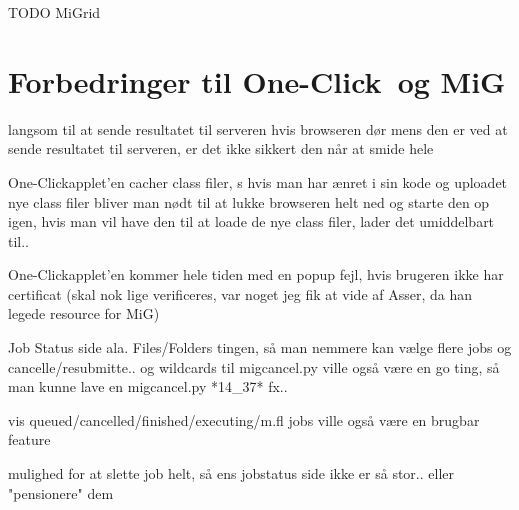 \documentclass[draft,a4paper,10pt]{article}
\newcommand{\mig}{MiG}
\newcommand{\oc}{One-Click}
\begin{document}


TODO MiGrid
\section{Forbedringer til \oc\ og \mig}
%
langsom til at sende resultatet til serveren hvis browseren dør mens den er ved
at sende resultatet til serveren, er det ikke sikkert den når at smide hele

\oc applet'en cacher class filer, s hvis man har ænret i sin kode og
uploadet nye class filer bliver man nødt til at lukke browseren helt ned og
starte den op igen, hvis man vil have den til at loade de nye class filer, lader
det umiddelbart til.. 

\oc applet'en kommer hele tiden med en popup fejl, hvis brugeren ikke har
certificat (skal nok lige verificeres, var noget jeg fik at vide af Asser, da
han legede resource for \mig)

Job Status side ala. Files/Folders
tingen, så man nemmere kan vælge flere jobs og cancelle/resubmitte.. og
wildcards til migcancel.py ville også være en go ting, så man kunne lave en
migcancel.py *14\_37* fx.. 

vis queued/cancelled/finished/executing/m.fl jobs ville også være en brugbar feature

mulighed for at slette job helt, så ens jobstatus side ikke er så stor.. eller
"pensionere" dem
\end{document}
